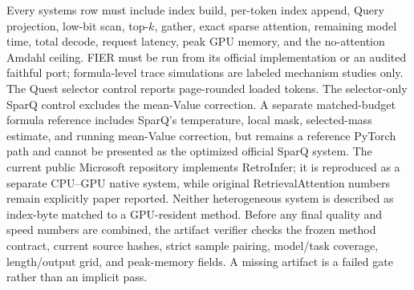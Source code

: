 Every systems row must include index build, per-token index append, Query
projection, low-bit scan, top-$k$, gather, exact sparse attention, remaining
model time, total decode, request latency, peak GPU memory, and the
no-attention Amdahl ceiling.
FIER must be run from its official implementation or an audited faithful port;
formula-level trace simulations are labeled mechanism studies only.
The Quest selector control reports page-rounded loaded tokens.  The
selector-only SparQ control excludes the mean-Value correction.  A separate
matched-budget formula reference includes SparQ's temperature, local mask,
selected-mass estimate, and running mean-Value correction, but remains a
reference PyTorch path and cannot be presented as the optimized official SparQ
system.  The current public Microsoft repository implements RetroInfer; it is
reproduced as a separate CPU--GPU native system, while original
RetrievalAttention numbers remain explicitly paper reported.  Neither
heterogeneous system is described as index-byte matched to a GPU-resident
method.
Before any final quality and speed numbers are combined, the artifact
verifier checks the frozen method contract, current source hashes, strict
sample pairing, model/task coverage, length/output grid, and peak-memory
fields.  A missing artifact is a failed gate rather than an implicit pass.
